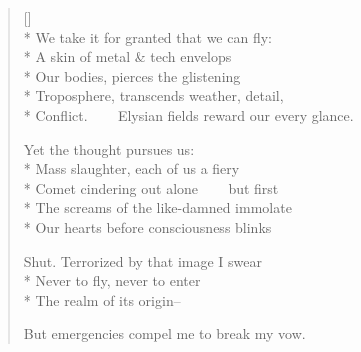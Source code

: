 \label{ch:precipitous_flight}
\settowidth{\versewidth}{Conflict.     Elysian fields reward our every glance.}
\begin{verse}[\versewidth]
\\*
We take it for granted that we can fly:\\*
A skin of metal \& tech envelops\\*
Our bodies, pierces the glistening\\*
Troposphere, transcends weather, detail,\\*
Conflict.     Elysian fields reward our every glance.

Yet the thought pursues us:\\*
Mass slaughter, each of us a fiery\\*
Comet cindering out alone     but first\\*
The screams of the like-damned immolate\\*
Our hearts before consciousness blinks

Shut. Terrorized by that image I swear\\*
Never to fly, never to enter\\*
The realm of its origin--

But emergencies compel me to break my vow.
\end{verse}

